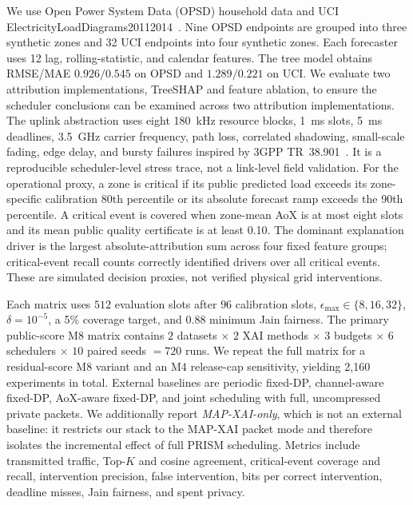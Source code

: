 \documentclass[conference]{IEEEtran}
\newcommand{\mapxai}{MAP-XAI}
\begin{document}
We use Open Power System Data (OPSD) household data and UCI
ElectricityLoadDiagrams20112014~\cite{opsd2020household,uci2015eld}.
Nine OPSD endpoints are grouped into three synthetic zones and 32 UCI
endpoints into four synthetic zones. Each forecaster uses 12 lag,
rolling-statistic, and calendar features. The tree model obtains
RMSE/MAE $0.926/0.545$ on OPSD and $1.289/0.221$ on UCI. We evaluate two
attribution implementations, TreeSHAP and feature ablation, to ensure the
scheduler conclusions can be examined across two attribution implementations.
The uplink abstraction uses eight 180~kHz resource blocks, 1~ms slots,
5~ms deadlines, 3.5~GHz carrier frequency, path loss, correlated
shadowing, small-scale fading, edge delay, and bursty failures inspired
by 3GPP TR~38.901~\cite{3gpp38901}. It is a reproducible
scheduler-level stress trace, not a link-level field validation.
For the operational proxy, a zone is critical if its public predicted
load exceeds its zone-specific calibration 80th percentile or its
absolute forecast ramp exceeds the 90th percentile. A critical event is
covered when zone-mean AoX is at most eight slots and its mean public
quality certificate is at least 0.10. The dominant explanation driver
is the largest absolute-attribution sum across four fixed feature groups;
critical-event recall counts correctly identified drivers over all
critical events. These are simulated decision proxies, not verified
physical grid interventions.

Each matrix uses $512$ evaluation slots after $96$ calibration slots,
$\epsilon_{\max}\in\{8,16,32\}$, $\delta=10^{-5}$, a 5\% coverage target,
and 0.88 minimum Jain fairness. The primary public-score M8 matrix contains
$2$ datasets $\times$ $2$ XAI methods $\times$ $3$ budgets $\times$ $6$
schedulers $\times$ $10$ paired seeds $=720$ runs. We repeat the full matrix
for a residual-score M8 variant and an M4 release-cap sensitivity, yielding
2,160 experiments in total.
External baselines are periodic fixed-DP, channel-aware fixed-DP,
AoX-aware fixed-DP, and joint scheduling with full, uncompressed private
packets. We additionally report \emph{MAP-XAI-only}, which is not an
external baseline: it restricts our stack to the \mapxai{} packet mode
and therefore isolates the incremental effect of full PRISM scheduling.
Metrics include transmitted traffic, Top-$K$ and cosine agreement,
critical-event coverage and recall, intervention precision, false
intervention, bits per correct intervention, deadline misses, Jain
fairness, and spent privacy.
\end{document}
